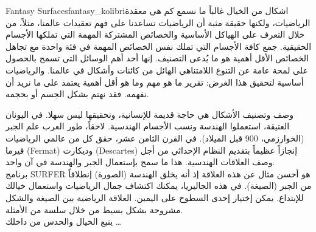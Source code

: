 \begin{surferIntroPage}{Fantasy Surfaces}{fantasy_kolibri}{اشكال من الخيال}
غالباً ما نسمع كم هي معقدة الرياضيات، ولكنها حقيقة مثبة أن الرياضيات تساعدنا على فهم تعقيدات عالمنا، مثلاً، من خلال التعرف على الهياكل الأساسية والخصائص المشتركة المهمة التي تملكها الأجسام الحقيقية. جمع كافة الأجسام التي تملك نفس الخصائص المهمة في فئة واحدة مع تجاهل الخصائص الأقل أهمية هو ما يُدعى التصنيف. إنها أحد أهم الوسائل التي تسمح بالحصول على لمحة عامة عن التنوع اللامتناهي الهائل من كائنات وأشكال في عالمنا. والرياضيات أساسية لتحقيق هذا الغرض: تقرير ما هو مهم وما هو أقل أهمية يعتمد على ما نريد أن نفهمه. فقد نهتم بشكل الجسم أو بحجمه.
 \\

\vspace{0.4cm}

وصف وتصنيف الأشكال هي حاجة قديمة للإنسانية، وتحقيقها ليس سهلا. في اليونان العتيقة، استعملوا الهندسة ونسب الأجسام الهندسية. لاحقاً، طور العرب علم الجبر (الخوارزمي، 900 قبل الميلاد). في القرن الثامن عشر، حقق كل من عالمي الرياضيات فيرما
 \textenglish{(Fermat)}
  وديكارت
 \textenglish{(Descartes)}
    إنجازاً عظيماً بتقديم النظام الإحداثي من أجل وصف العلاقات الهندسية. هذا ما سمح بإستعمال الجبر والهندسة في آن واحد.
\\
\vspace{0.4cm}
برنامج SURFER هو أحسن مثال عن هذه العلاقة إذ أنه يخلق الهندسة (الصورة) إنطلاقاً من الجبر (الصيغة).
في هذه الجاليريا، يمكنك اكتشاف جمال الرياضيات واستعمال خيالك للإبتداع. يمكن إختيار إحدى السطوح على اليمين. العلاقة الرياضية بين الصيغة والشكل مشروحة بشكل بسيط من خلال سلسة من الأمثلة.\\
ينبع الخيال والحدس من داخلك \dots
\end{surferIntroPage}